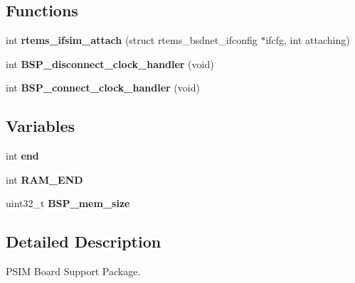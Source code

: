 \subsection*{Functions}
\begin{DoxyCompactItemize}
\item 
\mbox{\label{group__RTEMSBSPsPowerPCPSIM_ga2d296bfbc60c29877c733a866ea2e85a}} 
int {\bfseries rtems\+\_\+ifsim\+\_\+attach} (struct rtems\+\_\+bsdnet\+\_\+ifconfig $\ast$ifcfg, int attaching)
\item 
\mbox{\label{group__RTEMSBSPsPowerPCPSIM_ga5b6f7a1b73b76ef80251fd770905d0c1}} 
int {\bfseries B\+S\+P\+\_\+disconnect\+\_\+clock\+\_\+handler} (void)
\item 
\mbox{\label{group__RTEMSBSPsPowerPCPSIM_ga7e99fec6e3bd9986094a2de9cc0b110a}} 
int {\bfseries B\+S\+P\+\_\+connect\+\_\+clock\+\_\+handler} (void)
\end{DoxyCompactItemize}
\subsection*{Variables}
\begin{DoxyCompactItemize}
\item 
\mbox{\label{group__RTEMSBSPsPowerPCPSIM_gabce9f5dc9c83f2639b72024fdee5d388}} 
int {\bfseries end}
\item 
\mbox{\label{group__RTEMSBSPsPowerPCPSIM_ga90a78dabec9a7332292f01d55c2658f7}} 
int {\bfseries R\+A\+M\+\_\+\+E\+ND}
\item 
\mbox{\label{group__RTEMSBSPsPowerPCPSIM_gad69589c206f3dc9530777b56b2a0d1ad}} 
uint32\+\_\+t {\bfseries B\+S\+P\+\_\+mem\+\_\+size}
\end{DoxyCompactItemize}


\subsection{Detailed Description}
P\+S\+IM Board Support Package. 


